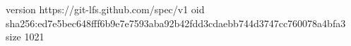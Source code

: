 version https://git-lfs.github.com/spec/v1
oid sha256:ed7e5bec648fff6b9e7e7593aba92b42fdd3cdaebb744d3747cc760078a4bfa3
size 1021
